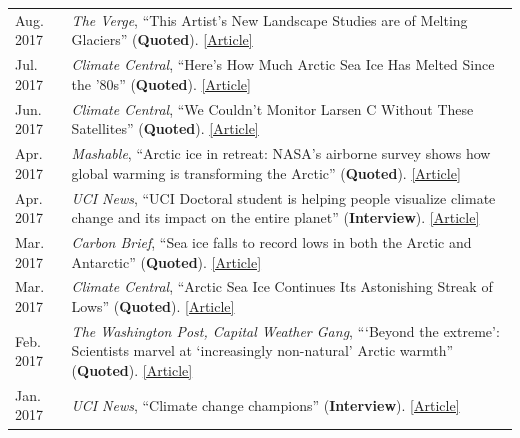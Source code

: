 \documentclass[margin,line,palatino,courier,10pt]{res}
\begin{document}
\begin{resume}
\begin{tabular}{@{}p{0.9in}p{4in}}
Aug. 2017 & \textit{The Verge}, ``This Artist's New Landscape Studies are of Melting Glaciers'' (\textbf{Quoted}). \href{https://www.theverge.com/2017/8/22/16171276/anthropocene-nasa-justin-brice-guariglia-photography-climate-change}{[Article]}\\
Jul. 2017 & \textit{Climate Central}, ``Here's How Much Arctic Sea Ice Has Melted Since the '80s'' (\textbf{Quoted}). \href{http://www.climatecentral.org/news/arctic-sea-ice-melt-since-the-80s-21637}{[Article]}\\
Jun. 2017 & \textit{Climate Central}, ``We Couldn't Monitor Larsen C Without These Satellites'' (\textbf{Quoted}). \href{http://www.climatecentral.org/news/larsen-c-monitoring-satellites-21564}{[Article]}\\
Apr. 2017 & \textit{Mashable}, ``Arctic ice in retreat: NASA's airborne survey shows how global warming is transforming the Arctic'' (\textbf{Quoted}). \href{http://mashable.com/2017/04/13/arctic-meltdown-nasa-photos-changing-ice/?utm_cid=hp-n-1#BgdepWyM6Pq3}{[Article]}\\
Apr. 2017 & \textit{UCI News}, ``UCI Doctoral student is helping people visualize climate change and its impact on the entire planet'' (\textbf{Interview}). \href{http://grad.uci.edu/news-and-events/student-spotlights/Zachary-Labe.html}{[Article]}\\
Mar. 2017 & \textit{Carbon Brief}, ``Sea ice falls to record lows in both the Arctic and Antarctic'' (\textbf{Quoted}). \href{https://www.carbonbrief.org/sea-ice-falls-record-lows-arctic-antarctic}{[Article]}\\
Mar. 2017 & \textit{Climate Central}, ``Arctic Sea Ice Continues Its Astonishing Streak of Lows'' (\textbf{Quoted}). \href{http://www.climatecentral.org/news/arctic-sea-ice-record-low-streak-21227}{[Article]}\\
Feb. 2017 & \textit{The Washington Post, Capital Weather Gang}, ```Beyond the extreme': Scientists marvel at `increasingly non-natural' Arctic warmth'' (\textbf{Quoted}). \href{https://www.washingtonpost.com/news/capital-weather-gang/wp/2017/02/01/beyond-the-extreme-scientists-marvel-at-increasingly-non-natural-arctic-warmth/?sdfsdfsdfsdfsd&utm_term=.cf3cf81d24f3}{[Article]}\\
Jan. 2017 & \textit{UCI News}, ``Climate change champions'' (\textbf{Interview}). \href{https://news.uci.edu/climate-change-champions/}{[Article]}\\
\end{tabular}
\begin{tabular}{@{}p{0.9in}p{4in}}

\end{tabular}
\end{resume}
\end{document}
